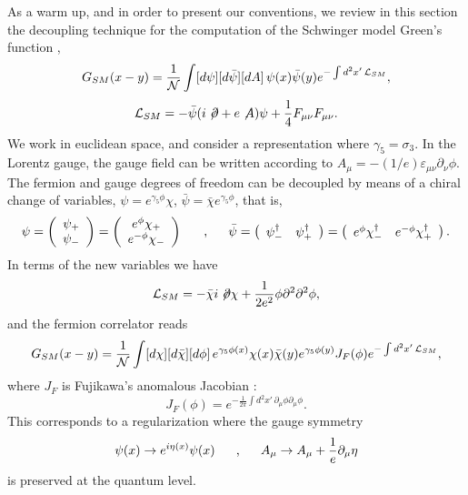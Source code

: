 \documentclass[a4paper,12pt]{article}
\begin{document}
As a warm up, and in order to present our conventions, we review in this section the 
decoupling technique for the computation of the Schwinger model Green's function \cite{rscha,n},
\begin{equation}
G_{SM}(x-y)=\frac{1}{\cal N}\int [d\psi][d\bar{\psi}][dA]\,
\psi(x) \bar{\psi}(y) e^{ -\int d^2x'\, {\cal L}_{SM}},
\label{corrSM}
\end{equation}
\begin{equation}
{\cal L}_{SM}=-\bar{\psi}(i\not\!\partial+ e \not\! A )\psi + 
\frac{1}{4} F_{\mu \nu}F_{\mu \nu}.
\end{equation}
We work in euclidean space, and consider a representation where $\gamma_5=\sigma_3$. In the Lorentz gauge, the gauge field 
can be written according to $A_\mu=-(1/e)\varepsilon_{\mu \nu}\partial_\nu \phi$. The fermion and gauge degrees of freedom can be decoupled by means of a chiral change of variables, 
$\psi=e^{\gamma_5\phi}\chi$, $\bar{\psi}=\bar{\chi} e^{\gamma_5\phi}$, that is,
\begin{equation}
\psi=\left( \begin{array}{c}
\psi_+          \\ \psi_-
\end{array}\right)=\left( \begin{array}{c}
e^\phi \chi_+          \\ e^{-\phi}\chi_-
\end{array}\right)\makebox[.5in]{,} \bar{\psi}=\left( \begin{array}{cc}
\psi_-^{\dagger} & \psi_+^{\dagger} \end{array}\right)=\left( \begin{array}{cc}
e^{\phi}\chi_-^{\dagger} & e^{-\phi}\chi_+^{\dagger} \end{array}\right).
\end{equation}
In terms of the new variables we have
\begin{equation}
{\cal L}_{SM}=-\bar{\chi}i\not\!\partial \chi + \frac{1}{2e^2}\phi \partial^2 \partial^2 \phi,
\end{equation}
and the fermion correlator reads
\begin{equation}
G_{SM}(x-y)=\frac{1}{\cal N}\int [d\chi][d\bar{\chi}][d\phi]\,
e^{\gamma_5\phi(x)}\chi(x) \bar{\chi}(y)e^{\gamma_5\phi(y)} J_F(\phi) e^{ -\int d^2x'\, {\cal L}_{SM}},
\label{corrSMd}
\end{equation}
where $J_F$ is Fujikawa's anomalous Jacobian \cite{f}:
\begin{equation}
J_F(\phi)=e^{-\frac{1}{2\pi}\int d^2x'\, \partial_\mu \phi \partial_\mu \phi}.
\end{equation}
This corresponds to a regularization where the gauge symmetry 
\begin{equation}
\psi(x)\rightarrow e^{i\eta(x)}\psi(x)\makebox[.5in]{,}
A_\mu\rightarrow A_\mu + \frac{1}{e} \partial_\mu \eta
\end{equation}
is preserved at the quantum level.
\end{document}
